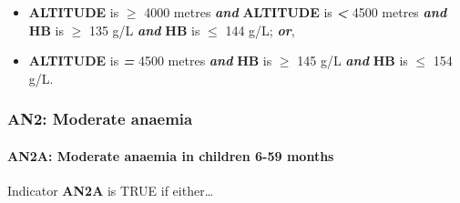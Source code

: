 \documentclass[12pt,a4paper]{article}
\let\oldparagraph\paragraph
\renewcommand{\paragraph}[1]{\oldparagraph{#1}\mbox{}}
\begin{document}
\begin{itemize}
\begin{itemize}
  \item
    \textbf{ALTITUDE} is \textbf{\emph{\(\geq\)}} 4000 metres \textbf{\emph{and}} \textbf{ALTITUDE} is \textbf{\emph{\textless{}}} 4500 metres \textbf{\emph{and}} \textbf{HB} is \textbf{\emph{\(\geq\)}} 135 g/L \textbf{\emph{and}} \textbf{HB} is \textbf{\emph{\(\leq\)}} 144 g/L; \textbf{\emph{or}},
  \item
    \textbf{ALTITUDE} is \textbf{\emph{=}} 4500 metres \textbf{\emph{and}} \textbf{HB} is \textbf{\emph{\(\geq\)}} 145 g/L \textbf{\emph{and}} \textbf{HB} is \textbf{\emph{\(\leq\)}} 154 g/L.
  \end{itemize}
\end{itemize}

\newpage

\hypertarget{an2-moderate-anaemia}{%
\subsubsection{AN2: Moderate anaemia}\label{an2-moderate-anaemia}}

\hypertarget{an2a-moderate-anaemia-in-children-6-59-months}{%
\paragraph{AN2A: Moderate anaemia in children 6-59 months}\label{an2a-moderate-anaemia-in-children-6-59-months}}

Indicator \textbf{AN2A} is TRUE if either\ldots{}
\end{document}
